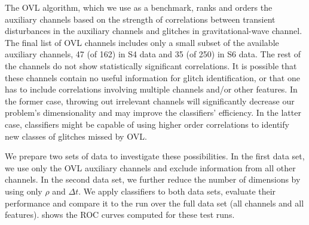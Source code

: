 \documentclass[prd, twocolumn, lengthcheck, superscriptaddress, showpacs, letterpaper, nofootinbib]{revtex4-1}
\begin{document}
The \ac{OVL} algorithm, which we use as a benchmark, ranks and orders the auxiliary channels based on the strength of correlations between transient disturbances in the auxiliary channels and glitches in gravitational-wave channel. The final list of \ac{OVL} channels includes only a small subset of the available auxiliary channels, 47 (of 162) in S4 data and 35 (of 250) in S6 data. The rest of the channels do not show statistically significant correlations. It is possible that these channels contain no useful information for glitch identification, or that one has to include correlations involving multiple channels and/or other features. In the former case, throwing out irrelevant channels will significantly decrease our problem's dimensionality and may improve the classifiers' efficiency. In the latter case, classifiers might be capable of using higher order correlations to identify new classes of glitches missed by \ac{OVL}. 

We prepare two sets of data to investigate these possibilities. In the first data set, we use only the {OVL} auxiliary channels and exclude information from all other channels. In the second data set, we further reduce the number of dimensions by using only $\rho$ and $\Delta t$. We apply classifiers to both data sets, evaluate their performance and compare it to the run over the full data set (all channels and all features).  shows the \ac{ROC} curves computed for these test runs. 

\end{document}
